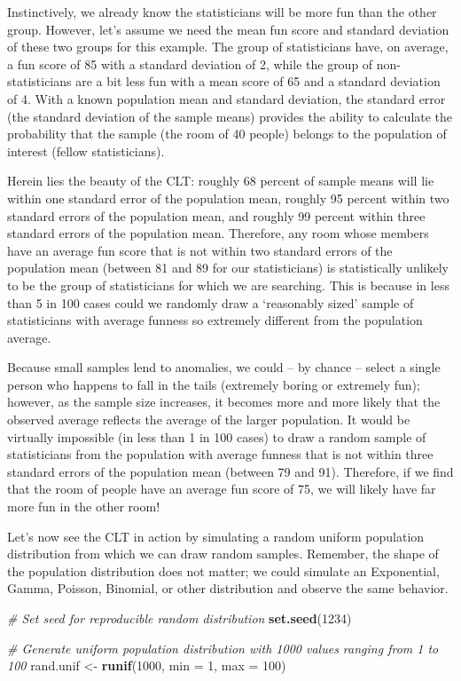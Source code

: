 \documentclass[]{book}
\newenvironment{Shaded}{\begin{snugshade}}{\end{snugshade}}
\newcommand{\CommentTok}[1]{\textcolor[rgb]{0.56,0.35,0.01}{\textit{#1}}}
\newcommand{\DataTypeTok}[1]{\textcolor[rgb]{0.13,0.29,0.53}{#1}}
\newcommand{\DecValTok}[1]{\textcolor[rgb]{0.00,0.00,0.81}{#1}}
\newcommand{\KeywordTok}[1]{\textcolor[rgb]{0.13,0.29,0.53}{\textbf{#1}}}
\newcommand{\NormalTok}[1]{#1}
\newcommand{\StringTok}[1]{\textcolor[rgb]{0.31,0.60,0.02}{#1}}
\begin{document}
Instinctively, we already know the statisticians will be more fun than the other group. However, let's assume we need the mean fun score and standard deviation of these two groups for this example. The group of statisticians have, on average, a fun score of 85 with a standard deviation of 2, while the group of non-statisticians are a bit less fun with a mean score of 65 and a standard deviation of 4. With a known population mean and standard deviation, the standard error (the standard deviation of the sample means) provides the ability to calculate the probability that the sample (the room of 40 people) belongs to the population of interest (fellow statisticians).

Herein lies the beauty of the CLT: roughly 68 percent of sample means will lie within one standard error of the population mean, roughly 95 percent within two standard errors of the population mean, and roughly 99 percent within three standard errors of the population mean. Therefore, any room whose members have an average fun score that is not within two standard errors of the population mean (between 81 and 89 for our statisticians) is statistically unlikely to be the group of statisticians for which we are searching. This is because in less than 5 in 100 cases could we randomly draw a `reasonably sized' sample of statisticians with average funness so extremely different from the population average.

Because small samples lend to anomalies, we could -- by chance -- select a single person who happens to fall in the tails (extremely boring or extremely fun); however, as the sample size increases, it becomes more and more likely that the observed average reflects the average of the larger population. It would be virtually impossible (in less than 1 in 100 cases) to draw a random sample of statisticians from the population with average funness that is not within three standard errors of the population mean (between 79 and 91). Therefore, if we find that the room of people have an average fun score of 75, we will likely have far more fun in the other room!

Let's now see the CLT in action by simulating a random uniform population distribution from which we can draw random samples. Remember, the shape of the population distribution does not matter; we could simulate an Exponential, Gamma, Poisson, Binomial, or other distribution and observe the same behavior.

\begin{Shaded}
\begin{Highlighting}[]
\CommentTok{# Set seed for reproducible random distribution}
\KeywordTok{set.seed}\NormalTok{(}\DecValTok{1234}\NormalTok{)}

\CommentTok{# Generate uniform population distribution with 1000 values ranging from 1 to 100}
\NormalTok{rand.unif <-}\StringTok{ }\KeywordTok{runif}\NormalTok{(}\DecValTok{1000}\NormalTok{, }\DataTypeTok{min =} \DecValTok{1}\NormalTok{, }\DataTypeTok{max =} \DecValTok{100}\NormalTok{)}
\end{Highlighting}
\end{Shaded}
\end{document}
